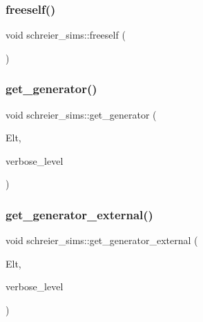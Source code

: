 \mbox{\label{classschreier__sims_ad3d72b681146b81d506f5e23048a0bff}} 
\subsubsection{\texorpdfstring{freeself()}{freeself()}}
{\footnotesize\ttfamily void schreier\+\_\+sims\+::freeself (\begin{DoxyParamCaption}{ }\end{DoxyParamCaption})}

\mbox{\label{classschreier__sims_ab8cc956f8a60d3a28ff2418973a4ca58}} 
\subsubsection{\texorpdfstring{get\+\_\+generator()}{get\_generator()}}
{\footnotesize\ttfamily void schreier\+\_\+sims\+::get\+\_\+generator (\begin{DoxyParamCaption}\item[{\mbox{\hyperlink{galois_8h_a09fddde158a3a20bd2dcadb609de11dc}{I\+NT}} $\ast$}]{Elt,  }\item[{\mbox{\hyperlink{galois_8h_a09fddde158a3a20bd2dcadb609de11dc}{I\+NT}}}]{verbose\+\_\+level }\end{DoxyParamCaption})}

\mbox{\label{classschreier__sims_a00f7c9c83b92d582c9a103787b39f1d4}} 
\subsubsection{\texorpdfstring{get\+\_\+generator\+\_\+external()}{get\_generator\_external()}}
{\footnotesize\ttfamily void schreier\+\_\+sims\+::get\+\_\+generator\+\_\+external (\begin{DoxyParamCaption}\item[{\mbox{\hyperlink{galois_8h_a09fddde158a3a20bd2dcadb609de11dc}{I\+NT}} $\ast$}]{Elt,  }\item[{\mbox{\hyperlink{galois_8h_a09fddde158a3a20bd2dcadb609de11dc}{I\+NT}}}]{verbose\+\_\+level }\end{DoxyParamCaption})}

